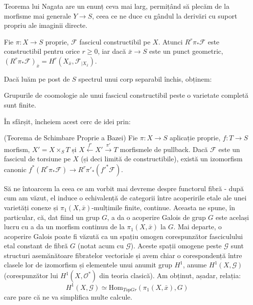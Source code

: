 \documentclass[13pt,openany,oneside]{book}
\begin{document}
Teorema lui Nagata are un enunț ceva mai larg, permițând să plecăm de la morfisme mai generale $Y \rightarrow S$, ceea ce ne duce cu gândul la derivări cu suport propriu ale imaginii directe.

\begin{teo}
Fie $\pi: X \rightarrow S$ proprie, $\mathcal{F}$ fascicul constructibil pe $X$. Atunci $R^r\pi_*\mathcal{F}$ este constructibil pentru orice $r \geq 0$, iar dacă $\bar{x} \rightarrow S$ este un punct geometric, $(R^r\pi_*\mathcal{F})_{\bar{x}} = H^r(X_{\bar{x}},\mathcal{F}_{\mid X_{\bar{x}}})$.
\end{teo}

Dacă luăm pe post de $S$ spectrul unui corp separabil închis, obținem:

\begin{cor}
Grupurile de coomologie ale unui fascicul constructibil peste o varietate completă sunt finite.
\end{cor}

În sfârșit, încheiem acest cerc de idei prin:

\begin{teo}
(Teorema de Schimbare Proprie a Bazei) Fie $\pi: X \rightarrow S$ aplicație proprie, $f: T \rightarrow S$ morfism, $X' = X \times_S T$ și $X\xleftarrow{f'}X'\xrightarrow{\pi'}T$ morfismele de pullback. Dacă $\mathcal{F}$ este un fascicul de torsiune pe $X$ (și deci limită de constructibile), există un izomorfism canonic $f^*(R^r\pi_*\mathcal{F}) \rightarrow R^r\pi'_*(f'^*\mathcal{F})$.
\end{teo}

Să ne întoarcem la ceea ce am vorbit mai devreme despre functorul fibră - după cum am văzut, el induce o echivalență de categorii între acoperirile etale ale unei varietăți conexe și $\pi_1(X,\bar{x})$-mulțimile finite, continue. Aceasta ne spune, în particular, că, dat fiind un grup $G$, a da o acoperire Galois de grup $G$ este același lucru cu a da un morfism continuu de la $\pi_1(X,\bar{x})$ la $G$. Mai departe, o acoperire Galois poate fi văzută ca un spațiu omogen corespunzător fasciculului etal constant de fibră $G$ (notat acum cu $\mathcal{G}$). Aceste spații omogene peste $\mathcal{G}$ sunt structuri asemănătoare fibratelor vectoriale și avem chiar o corespondență între clasele lor de izomorfism și elementele unui anumit grup $H^1$, anume $H^1(X,\mathcal{G})$ (corespunzător lui $H^1(X,\mathcal{O}^*)$ din teoria clasică). Am obținut, așadar, relația:
$$H^1(X,\mathcal{G}) \simeq \text{Hom}_{TopGr}(\pi_1(X,\bar{x}),G)$$
care pare că ne va simplifica multe calcule.
\end{document}
